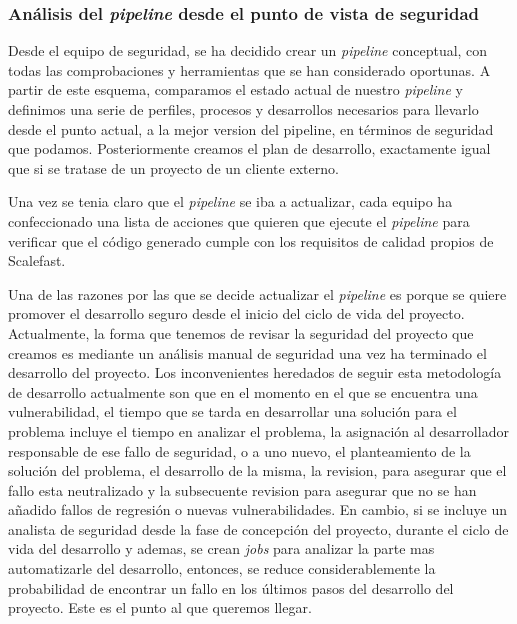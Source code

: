 \documentclass[12pt]{report} %
\begin{document}
\subsubsection{Análisis del \textit{\gls{pipeline}} desde el punto de vista de seguridad}

Desde el equipo de seguridad, se ha decidido crear un \textit{\gls{pipeline}} conceptual, con todas las comprobaciones y herramientas que se han considerado oportunas.
A partir de este esquema, comparamos el estado actual de nuestro \textit{\gls{pipeline}} y definimos una serie de perfiles, procesos y desarrollos necesarios para llevarlo desde el punto actual, a la mejor version del pipeline, en términos de seguridad que podamos.
Posteriormente creamos el plan de desarrollo, exactamente igual que si se tratase de un proyecto de un cliente externo.

Una vez se tenia claro que el \textit{\gls{pipeline}} se iba a actualizar, cada equipo ha confeccionado una lista de acciones que quieren que ejecute el \textit{\gls{pipeline}} para verificar que el código generado cumple con los requisitos de calidad propios de Scalefast.

Una de las razones por las que se decide actualizar el \textit{\gls{pipeline}} es porque se quiere promover el desarrollo seguro desde el inicio del ciclo de vida del proyecto.
Actualmente, la forma que tenemos de revisar la seguridad del proyecto que creamos es mediante un análisis manual de seguridad una vez ha terminado el desarrollo del proyecto.
Los inconvenientes heredados de seguir esta metodología de desarrollo actualmente son que en el momento en el que se encuentra una vulnerabilidad, el tiempo que se tarda en desarrollar una solución para el problema incluye el tiempo en analizar el problema, la asignación al desarrollador responsable de ese fallo de seguridad, o a uno nuevo, el planteamiento de la solución del problema, el desarrollo de la misma, la revision, para asegurar que el fallo esta neutralizado y la subsecuente revision para asegurar que no se han añadido fallos de regresión o nuevas vulnerabilidades.
En cambio, si se incluye un analista de seguridad desde la fase de concepción del proyecto, durante el ciclo de vida del desarrollo y ademas, se crean \textit{\gls{job}s} para analizar la parte mas automatizarle del desarrollo, entonces, se reduce considerablemente la probabilidad de encontrar un fallo en los últimos pasos del desarrollo del proyecto.
Este es el punto al que queremos llegar.
\end{document}

